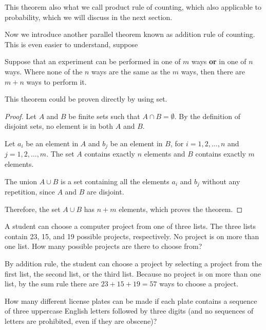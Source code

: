     This theorem also what we call product rule of counting, which also applicable to probability, which we will discuss in the next section.

    Now we introduce another parallel theorem known as addition rule of counting. This is even easier to understand, suppose 
    \begin{theorem}\label{Adittion Rule}
        Suppose that an experiment can be performed in one of $m$ ways \textbf{or} in one of $n$ ways. Where none of the $n$ ways are the same as the $m$
        ways, then there are $m+n$ ways to perform it.
    \end{theorem}
    This theorem could be proven directly by using set.
    \begin{proof}
        Let \( A \) and \( B \) be finite sets such that \( A \cap B = \emptyset \). By the definition of disjoint sets, no element is in both \( A \) and \( B \).
        
        Let \( a_i \) be an element in \( A \) and \( b_j \) be an element in \( B \), for \( i = 1, 2, \ldots, n \) and \( j = 1, 2, \ldots, m \). The set \( A \) contains exactly \( n \) elements and \( B \) contains exactly \( m \) elements.
        
        The union \( A \cup B \) is a set containing all the elements \( a_i \) and \( b_j \) without any repetition, since \( A \) and \( B \) are disjoint.
        
        Therefore, the set \( A \cup B \) has \( n + m \) elements, which proves the theorem.
        \end{proof}
    \begin{example}
        A student can choose a computer project from one of three lists. The three lists contain 23, 15, and 19 possible projects, respectively. 
        No project is on more than one list. How many possible projects are there to choose from?
    \end{example}
    \begin{solution}
        By addition rule, the student can choose a project by selecting a project from the first list, the second list, or the third list. Because no project is on more than one list, 
        by the sum rule there are $23 + 15 + 19 = 57$ ways to choose a project.
    \end{solution}

    \begin{example}
        How many different license plates can be made if each plate contains a sequence of three uppercase English letters followed by three digits (and no sequences of letters are prohibited, even if they are obscene)?
    \end{example}
        
